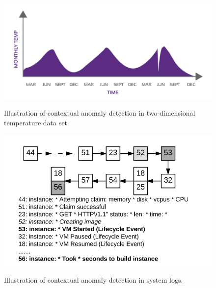 \begin{figure}
  \centering
  \begin{minipage}{.48\linewidth}
    \centering
      {\includegraphics[scale=0.35]{images/temperature.png}}
    \caption{Illustration of contextual anomaly detection in two-dimensional temperature data set.}
    \label{fig:temperatureContextual}
  \end{minipage}\quad
  \begin{minipage}{.48\linewidth}
    \centering
      {\includegraphics[scale=0.35]{images/deeplog.png}}
    \caption{Illustration of contextual anomaly detection in system logs.}
    \label{fig:deeplogContextual}
  \end{minipage}
  \bigskip

\end{figure}




